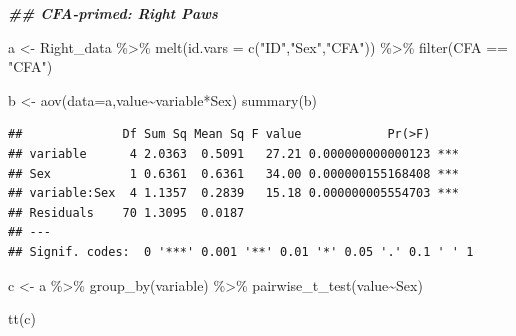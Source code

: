 \documentclass[
]{book}
\newenvironment{Shaded}{\begin{snugshade}}{\end{snugshade}}
\newcommand{\AttributeTok}[1]{\textcolor[rgb]{0.77,0.63,0.00}{#1}}
\newcommand{\DocumentationTok}[1]{\textcolor[rgb]{0.56,0.35,0.01}{\textbf{\textit{#1}}}}
\newcommand{\FunctionTok}[1]{\textcolor[rgb]{0.00,0.00,0.00}{#1}}
\newcommand{\NormalTok}[1]{#1}
\newcommand{\OtherTok}[1]{\textcolor[rgb]{0.56,0.35,0.01}{#1}}
\newcommand{\SpecialCharTok}[1]{\textcolor[rgb]{0.00,0.00,0.00}{#1}}
\newcommand{\StringTok}[1]{\textcolor[rgb]{0.31,0.60,0.02}{#1}}
\begin{document}
\begin{Shaded}
\begin{Highlighting}[]
\DocumentationTok{\#\# CFA{-}primed: Right Paws}

\NormalTok{a }\OtherTok{\textless{}{-}}\NormalTok{ Right\_data }\SpecialCharTok{\%\textgreater{}\%}
  \FunctionTok{melt}\NormalTok{(}\AttributeTok{id.vars =} \FunctionTok{c}\NormalTok{(}\StringTok{"ID"}\NormalTok{,}\StringTok{"Sex"}\NormalTok{,}\StringTok{"CFA"}\NormalTok{)) }\SpecialCharTok{\%\textgreater{}\%} 
  \FunctionTok{filter}\NormalTok{(CFA }\SpecialCharTok{==} \StringTok{"CFA"}\NormalTok{)}

\NormalTok{b }\OtherTok{\textless{}{-}} \FunctionTok{aov}\NormalTok{(}\AttributeTok{data=}\NormalTok{a,value}\SpecialCharTok{\textasciitilde{}}\NormalTok{variable}\SpecialCharTok{*}\NormalTok{Sex)}
\FunctionTok{summary}\NormalTok{(b)}
\end{Highlighting}
\end{Shaded}

\begin{verbatim}
##              Df Sum Sq Mean Sq F value            Pr(>F)    
## variable      4 2.0363  0.5091   27.21 0.000000000000123 ***
## Sex           1 0.6361  0.6361   34.00 0.000000155168408 ***
## variable:Sex  4 1.1357  0.2839   15.18 0.000000005554703 ***
## Residuals    70 1.3095  0.0187                              
## ---
## Signif. codes:  0 '***' 0.001 '**' 0.01 '*' 0.05 '.' 0.1 ' ' 1
\end{verbatim}

\begin{Shaded}
\begin{Highlighting}[]
\NormalTok{c }\OtherTok{\textless{}{-}}\NormalTok{ a }\SpecialCharTok{\%\textgreater{}\%}
  \FunctionTok{group\_by}\NormalTok{(variable) }\SpecialCharTok{\%\textgreater{}\%}
  \FunctionTok{pairwise\_t\_test}\NormalTok{(value}\SpecialCharTok{\textasciitilde{}}\NormalTok{Sex)}

\FunctionTok{tt}\NormalTok{(c)}
\end{Highlighting}
\end{Shaded}
\end{document}
